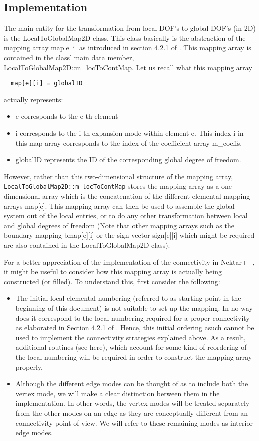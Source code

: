 \subsection{Implementation}
The main entity for the transformation from local DOF's to global DOF's (in 2D)
is the LocalToGlobalMap2D class. This class basically is the abstraction of the
mapping array map[e][i] as introduced in section 4.2.1 of \cite{KaSh05}. This
mapping array is contained in the class' main data member,
LocalToGlobalMap2D::m\_locToContMap. Let us recall what this mapping array 
\begin{lstlisting}
  map[e][i] = globalID
\end{lstlisting}
actually represents:
\begin{itemize}
\item e corresponds to the e th element
\item i corresponds to the i th expansion
mode within element e. This index i in this map array corresponds to the index of
 the coefficient array m\_coeffs.
\item globalID represents the ID of the corresponding global degree of freedom.
\end{itemize}

However, rather than this two-dimensional structure of the mapping array,\\
\texttt{LocalToGlobalMap2D::m\_locToContMap} stores the mapping array as a
one-dimensional array which is the concatenation of the different elemental
mapping arrays map[e]. This mapping array can then be used to assemble the
global system out of the local entries, or to do any other transformation
between local and global degrees of freedom (Note that other mapping arrays such
as the boundary mapping bmap[e][i] or the sign vector sign[e][i] which might be
required are also contained in the LocalToGlobalMap2D class).

For a better appreciation of the implementation of the connectivity in Nektar++,
it might be useful to consider how this mapping array is actually being
constructed (or filled). To understand this, first consider the following:
\begin{itemize}
\item The initial local elemental numbering (referred to as starting point in
the beginning of this document) is not suitable to set up the mapping. In no way
 does it correspond to the local numbering required for a proper connectivity as
 elaborated in Section 4.2.1 of \cite{KaSh05}. Hence, this initial ordering
 asuch cannot be used to implement the connectivity strategies explained above. As a
 result, additional routines (see here), which account for some kind of
 reordering of the local numbering will be required in order to construct the
 mapping array properly.
\item Although the different edge modes can be thought of as to include both
the vertex mode, we will make a clear distinction between them in the
 implementation. In other words, the vertex modes will be treated separately
 from the other modes on an edge as they are conceptually different from an
 connectivity point of view. We will refer to these remaining modes as interior
 edge modes.
\end{itemize}

